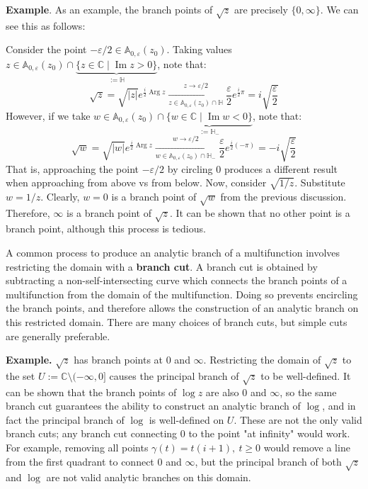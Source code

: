 \textbf{Example}. As an example, the branch points of $\sqrt{z}$ are precisely $\{0,\infty\}$. We can see this as follows:

Consider the point $-\varepsilon/2\in \mathbb{A}_{0,\varepsilon}(z_0)$. Taking values $z\in \mathbb{A}_{0,\varepsilon}(z_0)\cap\underbrace{\{z\in \mathbb{C}\mid \operatorname{Im}z > 0\}}_{:=\mathbb{H}}$, note that: \[\sqrt{z} = \sqrt{|z|} e^{\frac{i}{2}\operatorname{Arg} z}\xrightarrow[z\in \mathbb{A}_{0,\varepsilon}(z_0)\cap\mathbb{H}]{z\to \varepsilon/2} \frac{\varepsilon}{2} e^{\frac{i}{2}\pi} = i\sqrt{\frac{\varepsilon}{2}}\] However, if we take $w\in\mathbb{A}_{0,\varepsilon}(z_0)\cap \underbrace{\{w\in \mathbb{C}\mid \operatorname{Im}w < 0\}}_{:=\mathbb{H}_-}$, note that: \[\sqrt{w} = \sqrt{|w|}e^{\frac{i}{2}\operatorname{Arg}z} \xrightarrow[w\in\mathbb{A}_{0,\varepsilon}(z_0) \cap \mathbb{H}_-]{w\to\varepsilon/2} \frac{\varepsilon}{2}e^{\frac{i}{2}(-\pi)} = -i\sqrt{\frac{\varepsilon}{2}}\] That is, approaching the point $-\varepsilon/2$ by circling $0$ produces a different result when approaching from above vs from below. Now, consider $\sqrt{1/z}$. Substitute $w=1/z$. Clearly, $w=0$ is a branch point of $\sqrt{w}$ from the previous discussion. Therefore, $\infty$ is a branch point of $\sqrt{z}$. It can be shown that no other point is a branch point, although this process is tedious.

A common process to produce an analytic branch of a multifunction involves restricting the domain with a \textbf{branch cut}. A branch cut is obtained by subtracting a non-self-intersecting curve which connects the branch points of a multifunction from the domain of the multifunction. Doing so prevents encircling the branch points, and therefore allows the construction of an analytic branch on this restricted domain. There are many choices of branch cuts, but simple cuts are generally preferable.

\textbf{Example.} $\sqrt{z}$ has branch points at $0$ and $\infty$. Restricting the domain of $\sqrt{z}$ to the set $U:=\mathbb{C}\setminus(-\infty, 0]$ causes the principal branch of $\sqrt{z}$ to be well-defined. It can be shown that the branch points of $\log z$ are also $0$ and $\infty$, so the same branch cut guarantees the ability to construct an analytic branch of $\log$, and in fact the principal branch of $\log$ is well-defined on $U$. These are not the only valid branch cuts; any branch cut connecting $0$ to the point "at infinity" would work. For example, removing all points $\gamma(t) = t(i+1),\ t\geq 0$ would remove a line from the first quadrant to connect $0$ and $\infty$, but the principal branch of both $\sqrt{z}$ and $\log$ are not valid analytic branches on this domain.

